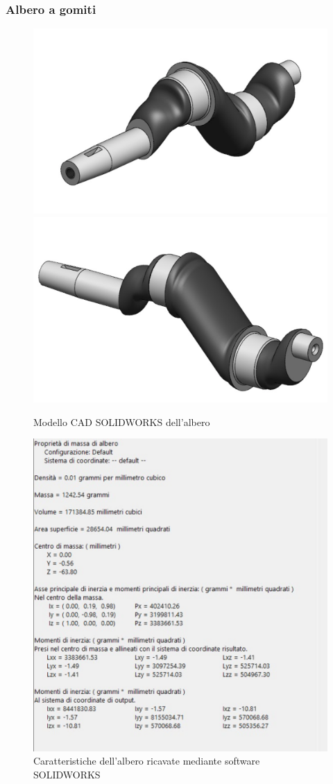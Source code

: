 \subsubsection{Albero a gomiti}
\begin{figure}[h]
\centering
   {\includegraphics[width=.48\textwidth]{Immagini/Albero1.png}} \quad
   {\includegraphics[width=.48\textwidth]{Immagini/Albero2.png}}
\caption{Modello CAD SOLIDWORKS dell'albero}
\label{fig:Albero}
\end{figure}
\begin{figure}[h]
    \centering
    \includegraphics[scale=0.66]{Immagini/CaratteristicheAlbero.png}
    \caption{Caratteristiche dell'albero ricavate mediante software SOLIDWORKS}
    \label{fig:CaratteristicheAlbero}
\end{figure}
\newpage

